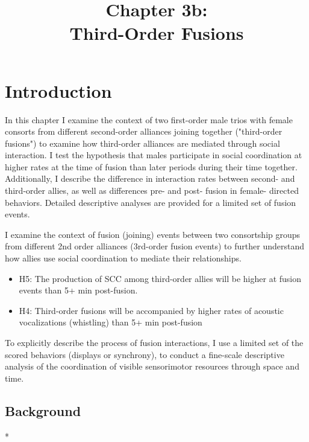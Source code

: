 \documentclass[11pt]{amsart}
\title{Chapter 3b: \\ Third-Order Fusions}
\date{}
\begin{document}
\maketitle

\section{Introduction}
In this chapter I examine the context of two first-order male trios with female consorts from different second-order alliances joining together ("third-order fusions") to examine how third-order alliances are mediated through social interaction. I test the hypothesis that males participate in social coordination at higher rates at the time of fusion than later periods during their time together. Additionally, I describe the difference in interaction rates between second- and third-order allies, as well as differences pre- and post- fusion in female- directed behaviors. Detailed descriptive analyses are provided for a limited set of fusion events.

\vspace{3mm}
\noindent I examine the context of fusion (joining) events between two consortship groups from different 2nd order alliances (3rd-order fusion events) to further understand how allies use social coordination to mediate their relationships. 
\begin{itemize}
\item H5: The production of SCC among third-order allies will be higher at fusion events than 5+ min post-fusion. 
\item H4: Third-order fusions will be accompanied by higher rates of acoustic vocalizations (whistling) than 5+ min post-fusion
\end{itemize}

\noindent To explicitly describe the process of fusion interactions, I use a limited set of the scored behaviors (displays or synchrony), to conduct a fine-scale descriptive analysis of the coordination of visible sensorimotor resources through space and time. 

\subsection{Background}
\vspace{3mm}
*
\end{document}
